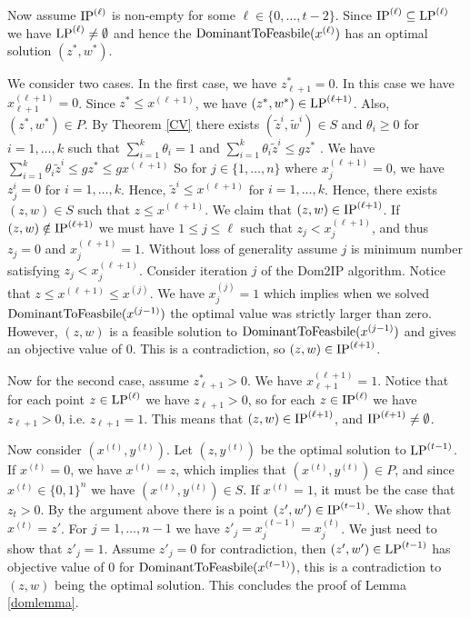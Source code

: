 	Now assume $\operatorname{IP}^{(\ell)}$ is non-empty for some $\ell \in \{0,\ldots,t-2\}$. Since $\operatorname{IP}^{(\ell)}\subseteq\operatorname{LP}^{(\ell)}$ we have $\operatorname{LP}^{(\ell)}\neq \emptyset$ and hence the $\operatorname{DominantToFeasbile}(x^{(\ell)})$ has an optimal solution $(z^*,w^*)$. 
	
	We consider two cases. In the first case, we have $z^*_{\ell+1}=0$. In this case we have $x^{(\ell+1)}_{\ell+1}=0$. Since $z^*\leq x^{(\ell+1)}$, we have $(z^*,w^*)\in \operatorname{LP}^{(\ell+1)}$. Also, $(z^*,w^*)\in P$. By Theorem \ref{CV} there exists $(\tilde{z}^i,\tilde{w}^i)\in S$ and $\theta_i\geq 0$ for $i=1,\ldots,k$ such that $\sum_{i=1}^{k} \theta_i = 1$ and  $\sum_{i=1}^{k}\theta_i \tilde{z}^i \leq gz^*$ . We have $\sum_{i=1}^{k}\theta_i \tilde{z}^i \leq gz^*\leq gx^{(\ell+1)}$
	So for $j\in \{1,\ldots,n\}$ where $x^{(\ell+1)}_j=0$, we have $z^i_j=0$ for $i=1,\ldots,k$. Hence, $\tilde{z}^i\leq x^{(\ell+1)}$ for $i=1,\ldots,k$. Hence, there exists $(z,w)\in S$ such that $z\leq x^{(\ell+1)}$. We claim that $(z,w)\in \operatorname{IP}^{(\ell+1)}$. If $(z,w)\notin \operatorname{IP}^{(\ell+1)}$ we must have $1\leq j \leq \ell$ such that $z_j < x^{(\ell+1)}_{j}$, and thus $z_j = 0$ and $x^{(\ell+1)}_j=1$. Without loss of generality assume $j$ is minimum number satisfying $z_j < x^{(\ell+1)}_{j}$. Consider iteration $j$ of the Dom2IP algorithm. Notice that $z\leq x^{(\ell+1)}\leq x^{(j)}$. We have $x^{(j)}_j=1$ which implies when we solved $\operatorname{DominantToFeasbile}(x^{(j-1)})$ the optimal value was strictly larger than zero. However, $(z,w)$ is a feasible solution to $\operatorname{DominantToFeasbile}(x^{(j-1)})$ and gives an objective value of 0. This is a contradiction, so $(z,w)\in \operatorname{IP}^{(\ell+1)}$.
	
	Now for the second case, assume $z^*_{\ell+1} > 0$. We have $x^{(\ell+1)}_{\ell+1}=1$. Notice that for each point $z\in \operatorname{LP}^{(\ell)}$ we have $z_{\ell+1} >0$, so for each $z\in \operatorname{IP}^{(\ell)}$ we have $z_{\ell+1}>0$, i.e. $z_{\ell+1}=1$. This means that $(z,w)\in \operatorname{IP}^{(\ell+1)}$, and $\operatorname{IP}^{(\ell+1)} \neq \emptyset$.
	
	Now consider $(x^{(t)},y^{(t)})$. Let $(z,y^{(t)})$ be the optimal solution to $\operatorname{LP}^{(t-1)}$. If $x^{(t)} = 0$, we have $x^{(t)} = z$, which implies that $(x^{(t)},y^{(t)})\in P$, and since $x^{(t)}\in \{0,1\}^n$ we have $(x^{(t)},y^{(t)})\in S$. If $x^{(t)} =1$, it must be the case that $z_t > 0$. By the argument above there is a point $(z',w')\in \operatorname{IP}^{(t-1)}$. We show that $x^{(t)} = z'$. For $j=1,\ldots,n-1$ we have $z'_j= x_j^{(t-1)}=x_j^{(t)}$. We just need to show that $z'_j = 1$. Assume $z'_j = 0$ for contradiction, then $(z',w')\in \operatorname{LP}^{(t-1)}$ has objective value of $0$ for $\operatorname{DominantToFeasbile}(x^{(t-1)})$, this is a contradiction to $(z,w)$ being the optimal solution. This concludes the proof of Lemma \ref{domlemma}. 
	
